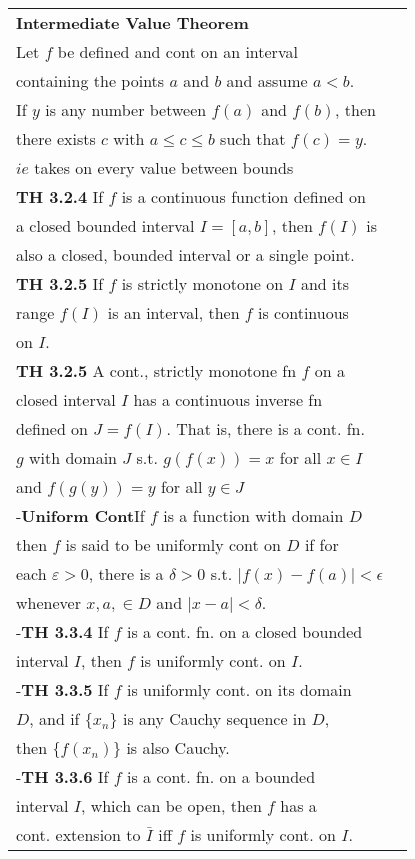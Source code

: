 \documentclass[10 pt,landscape]{article}
\begin{document}
\begin{multicols}{4}
\begin{tabular}{@{}ll@{}}
\textbf{Intermediate Value Theorem}\\
Let $f$ be defined and cont on an interval\\ containing the points $a$ and $b$ and assume $a<b$.\\ If $y$ is any number between $f(a)$ and $f(b)$, then \\ there exists $c$ with $a\leq c \leq b$ such that \:$f(c)=y$. \\$ie$ takes on every value between bounds\\
\textbf{TH 3.2.4} If $f$ is a continuous function defined on\\ a closed bounded interval $I=[a,b]$, then $f(I)$ is\\ also a closed, bounded interval or a single point.\\
\textbf{TH 3.2.5} If $f$ is strictly monotone on $I$ and its \\ range $f(I)$ is an interval, then $f$ is continuous \\on $I$.\\
\textbf{TH 3.2.5} A cont., strictly monotone fn $f$ on a \\closed interval $I$ has a continuous  inverse fn\\ defined on $J=f(I)$. That is, there is a cont. fn. \\ $g$ with domain $J$ s.t. $g(f(x))=x$ for all $x \in I$\\ and $f(g(y))=y$ for all $y \in J$\\
-\textbf{Uniform Cont}If $f$ is a function with domain $D$\\ then $f$ is said to be uniformly cont on $D$ if for \\each $\varepsilon >0$, there is a $\delta >0$ s.t. $|f(x)-f(a)|< \epsilon$\\ whenever $x,a,\in D$  and $|x-a|<\delta$.\\
-\textbf{TH 3.3.4} If $f$ is a cont. fn. on a closed bounded \\interval $I$, then $f$ is uniformly cont. on $I$.\\
-\textbf{TH 3.3.5} If $f$ is uniformly cont. on its domain\\ $D$, and if $\{x_n\}$ is any Cauchy sequence in $D$,\\ then $\{f(x_n)\}$ is also Cauchy.\\
-\textbf{TH 3.3.6} If $f$ is a cont. fn. on a bounded\\ interval $I$, which can be open, then $f$ has a\\ cont. extension to $\bar{I}$ iff $f$ is uniformly cont. on $I$.\\
\end{tabular}



\end{multicols}
\end{document}
